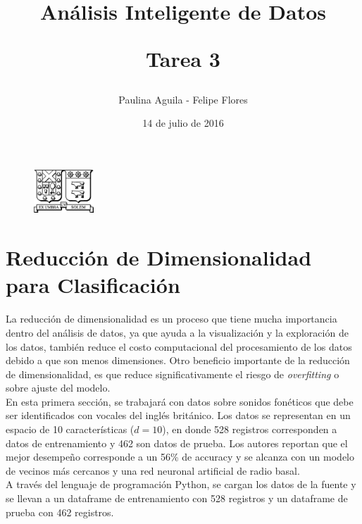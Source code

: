 \documentclass[letter, 10pt]{article}
\begin{document}
\title{Análisis Inteligente de Datos \\ \begin{Large}Tarea 3\end{Large}}
\author{Paulina Aguila - Felipe Flores}
\date{14 de julio de 2016}

\maketitle


\begin{figure}[ht]
\begin{center}
\includegraphics[width=0.2\textwidth]{Images/Isotipo-Negro.png}\\
\end{center}
\end{figure}
\vspace{2cm}

\section{Reducción de Dimensionalidad para Clasificación}

La reducción de dimensionalidad es un proceso que tiene mucha importancia dentro del análisis de datos, ya que ayuda a la visualización y la exploración de los datos, también reduce el costo computacional del procesamiento de los datos debido a que son menos dimensiones. Otro beneficio importante de la reducción de dimensionalidad, es que reduce significativamente el riesgo de \textit{overfitting} o sobre ajuste del modelo.\\

En esta primera sección, se trabajará con datos sobre sonidos fonéticos que debe ser identificados con vocales del inglés británico. Los datos se representan en un espacio de 10 características ($d=10$), en donde 528 registros corresponden a datos de entrenamiento y 462 son datos de prueba. Los autores reportan que el mejor desempeño corresponde a un 56\% de accuracy y se alcanza con un modelo de vecinos más cercanos y una red neuronal artificial de radio basal.\\

A través del lenguaje de programación Python, se cargan los datos de la fuente \cite{D1} y se llevan a un dataframe de entrenamiento con 528 registros y un dataframe de prueba con 462 registros.\\
\end{document}
